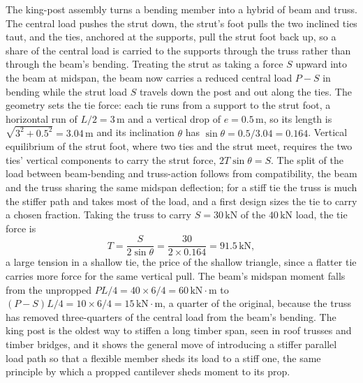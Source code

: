 The king-post assembly turns a bending member into a hybrid of beam and
truss. The central load pushes the strut down, the strut's foot pulls the
two inclined ties taut, and the ties, anchored at the supports, pull the
strut foot back up, so a share of the central load is carried to the
supports through the truss rather than through the beam's bending. Treating
the strut as taking a force $S$ upward into the beam at midspan, the beam
now carries a reduced central load $P - S$ in bending while the strut load
$S$ travels down the post and out along the ties. The geometry sets the tie
force: each tie runs from a support to the strut foot, a horizontal run of
$L/2 = 3\,\si{\meter}$ and a vertical drop of $e = 0.5\,\si{\meter}$, so
its length is $\sqrt{3^2 + 0.5^2} = 3.04\,\si{\meter}$ and its inclination
$\theta$ has $\sin\theta = 0.5/3.04 = 0.164$. Vertical equilibrium of the
strut foot, where two ties and the strut meet, requires the two ties'
vertical components to carry the strut force, $2 T\sin\theta = S$. The
split of the load between beam-bending and truss-action follows from
compatibility, the beam and the truss sharing the same midspan deflection;
for a stiff tie the truss is much the stiffer path and takes most of the
load, and a first design sizes the tie to carry a chosen fraction. Taking
the truss to carry $S = 30\,\text{kN}$ of the $40\,\text{kN}$ load, the tie
force is
\[
T = \frac{S}{2\sin\theta} = \frac{30}{2 \times 0.164}
= 91.5\,\text{kN},
\]
a large tension in a shallow tie, the price of the shallow triangle, since
a flatter tie carries more force for the same vertical pull. The beam's
midspan moment falls from the unpropped $PL/4 = 40 \times 6/4 =
60\,\text{kN}\cdot\text{m}$ to $(P - S)L/4 = 10 \times 6/4 =
15\,\text{kN}\cdot\text{m}$, a quarter of the original, because the truss
has removed three-quarters of the central load from the beam's bending.
The king post is the oldest way to stiffen a long timber span, seen in
roof trusses and timber bridges, and it shows the general move of
introducing a stiffer parallel load path so that a flexible member sheds
its load to a stiff one, the same principle by which a propped cantilever
sheds moment to its prop.



